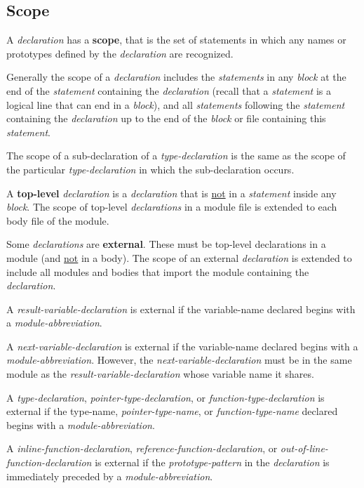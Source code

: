 \documentclass[12pt]{article}
\newcommand{\key}[1]{{\rm \bfseries #1}}
\begin{document}
\subsection{Scope}
\label{SCOPE}

A {\em declaration} has a \key{scope},
that is the set of statements in which any
names or prototypes defined by the {\em declaration}
are recognized.

Generally the scope of a {\em declaration} includes the {\em statements}
in any {\em block} at the end of the {\em statement}
containing the {\em declaration} (recall that a {\em statement} is a
logical line that can end in a {\em block}), and
all {\em statements} following the {\em statement} containing
the {\em declaration} up to the end of the {\em block} or file
containing this {\em statement}.

The scope of a sub-declaration of a {\em type-declaration} is
the same as the scope of the particular {\em type-declaration}
in which the sub-declaration occurs.

A \key{top-level} {\em declaration} is a {\em declaration} that is
\underline{not} in a {\em statement} inside any {\em block}.
The scope of top-level {\em declarations} in a module file is extended
to each body file of the module.

Some {\em declarations} are \key{external}\label{EXTERNAL}.
These must be top-level declarations in a module (and \underline{not}
in a body).
The scope of an external
{\em declaration} is extended to include all modules and bodies that
import the module containing the {\em declaration}.

A {\em result-variable-declaration}
is external if the {variable-name} declared begins with a
{\em module-abbreviation}.

A {\em next-variable-declaration}
is external if the {variable-name} declared begins with a
{\em module-abbreviation}.  However, the {\em next-variable-declaration}
must be in the same module as the {\em result-variable-declaration}
whose variable name it shares.

A {\em type-declaration}, {\em pointer-type-declaration}, or
{\em function-type-declaration}
\label{EXTERNAL-TYPE-NAME}
is external if the {type-name}, {\em pointer-type-name},
or {\em function-type-name}
declared begins with a
{\em module-abbrev\-i\-a\-tion}.

A {\em inline-function-declaration}, {\em reference-function-declaration},
or {\em out-of-line-function-declar\-a\-tion}
is external\label{EXTERNAL-FUNCTION}
if the {\em prototype-pattern} in the {\em declaration}
is immediately preceded by a {\em module-abbreviation}.
\end{document}
